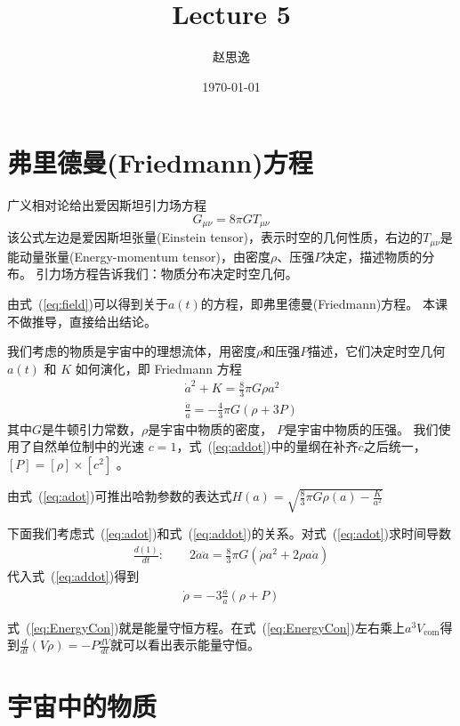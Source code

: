 \documentclass[12pt]{ctexart}
\title{Lecture 5}
\author{赵思逸}
\date{\today}
\newcommand{\refeq}[1]{式~(\ref{#1})}
\begin{document}
\maketitle

\section{弗里德曼(Friedmann)方程}

广义相对论给出爱因斯坦引力场方程
\begin{equation} \label{eq:field}
    G_{\mu \nu} = 8 \pi G T_{\mu \nu}
\end{equation}
该公式左边是爱因斯坦张量(Einstein tensor)，表示时空的几何性质，右边的$T_{\mu\nu}$是能动量张量(Energy-momentum tensor)，由密度$\rho$、压强$P$决定，描述物质的分布。
引力场方程告诉我们：物质分布决定时空几何。

由\refeq{eq:field}可以得到关于$a(t)$的方程，即弗里德曼(Friedmann)方程。
本课不做推导，直接给出结论。

我们考虑的物质是宇宙中的理想流体，用密度$\rho$和压强$P$描述，它们决定时空几何 $a(t)$ 和 $K$ 如何演化，即 Friedmann 方程
\begin{eqnarray}
    &&\dot{a}^2+K = \frac{8}{3} \pi G \rho a^2 \label{eq:adot} \\
    &&\frac{\ddot{a}}{a} = -\frac{4}{3} \pi G (\rho + 3P) \label{eq:addot}
\end{eqnarray}
其中$G$是牛顿引力常数，$\rho$是宇宙中物质的密度， $P$是宇宙中物质的压强。 
我们使用了自然单位制中的光速 $c=1$，\refeq{eq:addot}中的量纲在补齐$c$之后统一，$[P]=[\rho] \times [c^2]$ 。


由\refeq{eq:adot}可推出哈勃参数的表达式$H(a)=\sqrt{\frac{8}{3}\pi G \rho(a)-\frac{K}{a^2}}$


下面我们考虑\refeq{eq:adot}和\refeq{eq:addot}的关系。对\refeq{eq:adot}求时间导数
\begin{eqnarray}
    \frac{d(1)}{dt} : \qquad 2\dot{a}\ddot{a} = \frac{8}{3} \pi G (\dot{\rho} a^2 + 2\rho a \dot{a})
\end{eqnarray}
代入\refeq{eq:addot}得到
\begin{eqnarray}
    \dot{\rho} = -3\frac{\dot{a}}{a}(\rho+P) \label{eq:EnergyCon}
\end{eqnarray}

\refeq{eq:EnergyCon}就是能量守恒方程。在\refeq{eq:EnergyCon}左右乘上$a^3 V_\text{com}$得到$\frac{d}{dt}(V\rho) = -P\frac{dV}{dt}$就可以看出表示能量守恒。

\section{宇宙中的物质}
\end{document}
